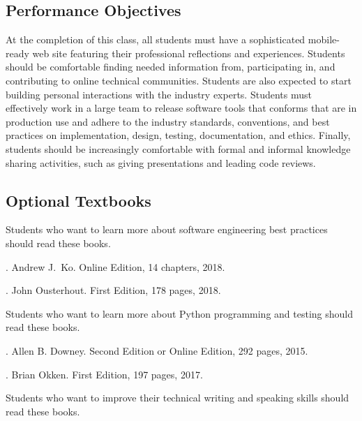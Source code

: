 \documentclass[11pt]{article}
\begin{document}
\subsection*{Performance Objectives}

At the completion of this class, all students must have a sophisticated
mobile-ready web site featuring their professional reflections and experiences.
Students should be comfortable finding needed information from, participating
in, and contributing to online technical communities. Students are also expected
to start building personal interactions with the industry experts.
%
Students must effectively work in a large team to release software tools that
conforms that are in production use and adhere to the industry standards,
conventions, and best practices on implementation, design, testing,
documentation, and ethics.
%
Finally, students should be increasingly comfortable with formal and informal
knowledge sharing activities, such as giving presentations and leading code
reviews.

\subsection*{Optional Textbooks}

\noindent Students who want to learn more about software engineering best
practices should read these books.
%
\vspace*{.1em}

. Andrew J.\ Ko.
Online Edition, 14 chapters, 2018.
%
\vspace*{.25em}

. John Ousterhout.
First Edition, 178 pages, 2018.
%
\vspace*{1em}

\noindent Students who want to learn more about Python programming and testing
should read these books.
%
\vspace*{.1em}

. Allen B. Downey.
Second Edition or Online Edition, 292 pages, 2015.
%
\vspace*{.25em}

. Brian Okken.
First Edition, 197 pages, 2017.
%
\vspace*{1em}

\noindent Students who want to improve their technical writing and speaking
skills should read these books.
%
\vspace*{.25em}
\end{document}
